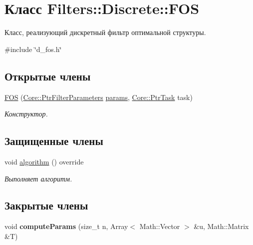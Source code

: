 \hypertarget{class_filters_1_1_discrete_1_1_f_o_s}{}\section{Класс Filters\+:\+:Discrete\+:\+:F\+OS}
\label{class_filters_1_1_discrete_1_1_f_o_s}


Класс, реализующий дискретный фильтр оптимальной структуры.  




{\ttfamily \#include \char`\"{}d\+\_\+fos.\+h\char`\"{}}

\subsection*{Открытые члены}
\begin{DoxyCompactItemize}
\item 
\hypertarget{class_filters_1_1_discrete_1_1_f_o_s_a4ccb53bc00846f7ca140b55316241749}{}\label{class_filters_1_1_discrete_1_1_f_o_s_a4ccb53bc00846f7ca140b55316241749} 
\hyperlink{class_filters_1_1_discrete_1_1_f_o_s_a4ccb53bc00846f7ca140b55316241749}{F\+OS} (\hyperlink{namespace_core_a4811af8148ba137d644b9a61a042cf03}{Core\+::\+Ptr\+Filter\+Parameters} \hyperlink{class_core_1_1_filter_a44aa749b49ba46256975ce545531ecf7}{params}, \hyperlink{namespace_core_abfda8f69fcacfcea2696549b548ed737}{Core\+::\+Ptr\+Task} task)
\begin{DoxyCompactList}\small\item\em Конструктор. \end{DoxyCompactList}\end{DoxyCompactItemize}
\subsection*{Защищенные члены}
\begin{DoxyCompactItemize}
\item 
void \hyperlink{class_filters_1_1_discrete_1_1_f_o_s_a66b52dd04e77257393fe156b71e5582f}{algorithm} () override
\begin{DoxyCompactList}\small\item\em Выполняет алгоритм. \end{DoxyCompactList}\end{DoxyCompactItemize}
\subsection*{Закрытые члены}
\begin{DoxyCompactItemize}
\item 
\hypertarget{class_filters_1_1_discrete_1_1_f_o_s_ac00393ddad3a1ba203e09db8cbc52944}{}\label{class_filters_1_1_discrete_1_1_f_o_s_ac00393ddad3a1ba203e09db8cbc52944} 
void {\bfseries compute\+Params} (size\+\_\+t n, Array$<$ Math\+::\+Vector $>$ \&u, Math\+::\+Matrix \&T)
\end{DoxyCompactItemize}

